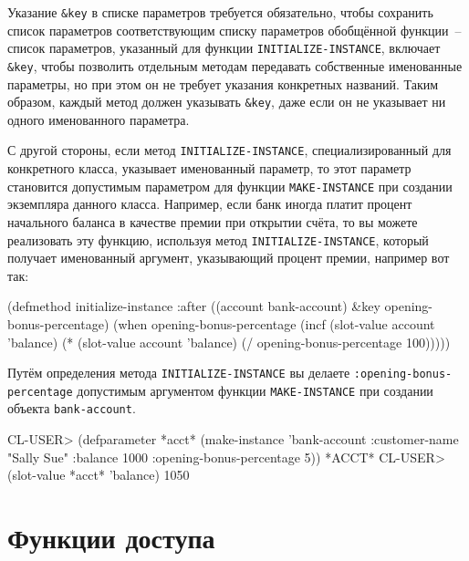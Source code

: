 Указание \lstinline!&key! в списке параметров требуется обязательно, чтобы сохранить
список параметров соответствующим списку параметров обобщённой функции~-- список
параметров, указанный для функции \lstinline{INITIALIZE-INSTANCE}, включает \lstinline!&key!,
чтобы позволить отдельным методам передавать собственные именованные параметры, но при
этом он не требует указания конкретных названий.  Таким образом, каждый метод должен
указывать \lstinline!&key!, даже если он не указывает ни одного именованного параметра.

С другой стороны, если метод \lstinline{INITIALIZE-INSTANCE}, специализированный для
конкретного класса, указывает именованный параметр, то этот параметр становится допустимым
параметром для функции \lstinline{MAKE-INSTANCE} при создании экземпляра данного класса.
Например, если банк иногда платит процент начального баланса в качестве премии при
открытии счёта, то вы можете реализовать эту функцию, используя метод
\lstinline{INITIALIZE-INSTANCE}, который получает именованный аргумент, указывающий процент
премии, например вот так:

\begin{myverb}
(defmethod initialize-instance :after ((account bank-account)
                                       &key opening-bonus-percentage)
  (when opening-bonus-percentage
    (incf (slot-value account 'balance)
          (* (slot-value account 'balance) (/ opening-bonus-percentage 100)))))
\end{myverb}

Путём определения метода \lstinline{INITIALIZE-INSTANCE} вы делаете
\lstinline{:opening-bonus-percentage} допустимым аргументом функции \lstinline{MAKE-INSTANCE} при
создании объекта \lstinline{bank-account}.

\begin{myverb}
CL-USER> (defparameter *acct* (make-instance
                                'bank-account
                                 :customer-name "Sally Sue"
                                 :balance 1000
                                 :opening-bonus-percentage 5))
*ACCT*
CL-USER> (slot-value *acct* 'balance)
1050
\end{myverb}

\section{Функции доступа}

